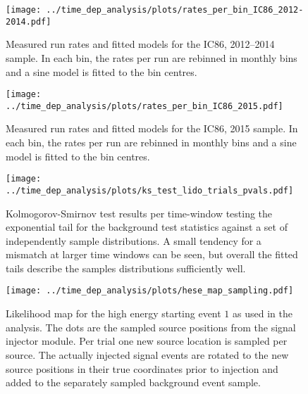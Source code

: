\begin{figure}[H]
  \centering
  \texttt{[image: ../time\_dep\_analysis/plots/rates\_per\_bin\_IC86\_2012-2014.pdf]}
  \caption[Rate models per bin for sample IC79]{
    Measured run rates and fitted models for the IC86, 2012--2014 sample.
    In each bin, the rates per run are rebinned in monthly bins and a sine model is fitted to the bin centres.
  }
  \label{fig:rates_per_bin_IC86_2012-2014}
\end{figure}

\begin{figure}[H]
  \centering
  \texttt{[image: ../time\_dep\_analysis/plots/rates\_per\_bin\_IC86\_2015.pdf]}
  \caption[Rate models per bin for sample IC79]{
    Measured run rates and fitted models for the IC86, 2015 sample.
    In each bin, the rates per run are rebinned in monthly bins and a sine model is fitted to the bin centres.
  }
  \label{fig:rates_per_bin_IC86_2015}
\end{figure}

\begin{figure}[H]
  \centering
  \texttt{[image: ../time\_dep\_analysis/plots/ks\_test\_lido\_trials\_pvals.pdf]}
  \caption[KS test using independent trials for the time-dependent BG TSs]{
    Kolmogorov-Smirnov test results per time-window testing the exponential tail for the background test statistics against a set of independently sample distributions.
    A small tendency for a mismatch at larger time windows can be seen, but overall the fitted tails describe the samples distributions sufficiently well.
  }
  \label{fig:ks_test_lido_trials_pvals}
\end{figure}
\enlargethispage*{5cm}
\begin{figure}[H]
  \centering
  \texttt{[image: ../time\_dep\_analysis/plots/hese\_map\_sampling.pdf]}
  \caption[Sampling from a healpy map for the signal source injection]{
    Likelihood map for the high energy starting event $1$ as used in the analysis.
    The dots are the sampled source positions from the signal injector module.
    Per trial one new source location is sampled per source.
    The actually injected signal events are rotated to the new source positions in their true coordinates prior to injection and added to the separately sampled background event sample.
  }
  \label{fig:hese_map_sampling}
\end{figure}

